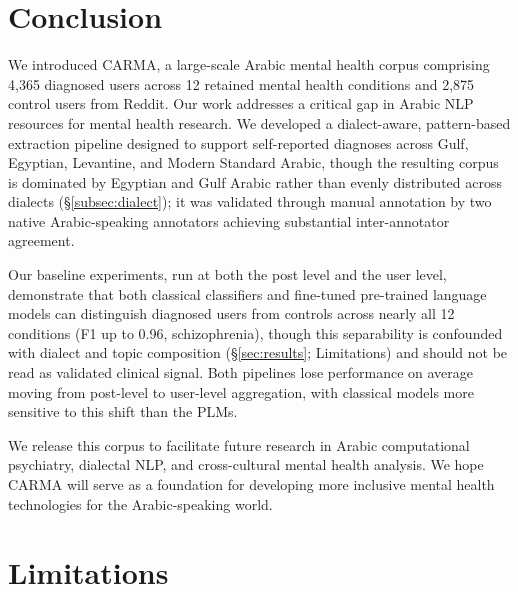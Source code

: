 \documentclass[11pt]{article}
\begin{document}
\section{Conclusion}
We introduced CARMA, a large-scale Arabic mental health corpus comprising 4,365 diagnosed users across 12 retained mental health conditions and 2,875 control users from Reddit. Our work addresses a critical gap in Arabic NLP resources for mental health research. We developed a dialect-aware, pattern-based extraction pipeline designed to support self-reported diagnoses across Gulf, Egyptian, Levantine, and Modern Standard Arabic, though the resulting corpus is dominated by Egyptian and Gulf Arabic rather than evenly distributed across dialects (§\ref{subsec:dialect}); it was validated through manual annotation by two native Arabic-speaking annotators achieving substantial inter-annotator agreement.

Our baseline experiments, run at both the post level and the user level, demonstrate that both classical classifiers and fine-tuned pre-trained language models can distinguish diagnosed users from controls across nearly all 12 conditions (F1 up to 0.96, schizophrenia), though this separability is confounded with dialect and topic composition (§\ref{sec:results}; Limitations) and should not be read as validated clinical signal. Both pipelines lose performance on average moving from post-level to user-level aggregation, with classical models more sensitive to this shift than the PLMs.

We release this corpus to facilitate future research in Arabic computational psychiatry, dialectal NLP, and cross-cultural mental health analysis. We hope CARMA will serve as a foundation for developing more inclusive mental health technologies for the Arabic-speaking world.




\section*{Limitations}
\end{document}
